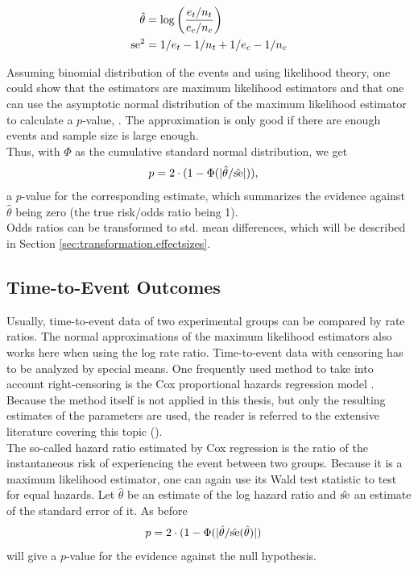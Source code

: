 \documentclass[11pt,a4paper,twoside]{book}\usepackage[]{graphicx}\usepackage[]{color}
\begin{document}
\begin{align}
\hat{\theta} &= \log\bigg(\frac{e_t/n_t}{e_c/n_c}\bigg) \label{eq:risk.ratio} \\
\operatorname{se}^2&= 1/e_t - 1/n_t + 1/e_c - 1/n_c \label{eq:risk.ratio.variance}
\end{align}

Assuming binomial distribution of the events and using likelihood theory, one could show that the estimators are maximum likelihood estimators and that one can use the asymptotic normal distribution of the maximum likelihood estimator to calculate a  $p$\hspace{0.4mm}-value, \eg \cite[98]{held2014}. The approximation is only good if there are enough events and sample size is large enough.\\
Thus, with $\Phi$ as the cumulative standard normal distribution, we get
\begin{align}
p &= 2\cdot(1-\Phi(|\hat{\theta}/\hat{\operatorname{se}}|)), \nonumber
\end{align}
a  $p$\hspace{0.4mm}-value for the corresponding estimate, which summarizes the evidence against $\hat{\theta}$ being zero (\ie the true risk/odds ratio being 1). \\
Odds ratios can be transformed to std. mean differences, which will be described in Section \ref{sec:transformation.effectsizes}.

\subsection{Time-to-Event Outcomes}
Usually, time-to-event data of two experimental groups can be compared by rate ratios. The normal approximations of the maximum likelihood estimators also works here when using the log rate ratio.
Time-to-event data with censoring has to be analyzed by special means. One frequently used method to take into account right-censoring is the Cox proportional hazards regression model \citep{Cox}. Because the method itself is not applied in this thesis, but only the resulting estimates of the parameters are used, the reader is referred to the extensive literature covering this topic (\eg \citealp{Surv}). \\
The so-called hazard ratio estimated by Cox regression is the ratio of the instantaneous risk of experiencing the event between two groups. Because it is a maximum likelihood estimator, one can again use its Wald test statistic to test for equal hazards. Let $\hat{\theta}$ be an estimate of the log hazard ratio and $\hat{\operatorname{se}}$ an estimate of the standard error of it. As before
\begin{align}
p &= 2\cdot(1-\Phi(|\hat{\theta}/\hat{\operatorname{se}}(\hat{\theta})|) \nonumber
\end{align}
will give a  $p$\hspace{0.4mm}-value for the evidence against the null hypothesis.
\end{document}
